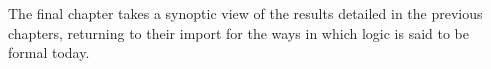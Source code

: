 			
			The final chapter takes a synoptic view of the results detailed in the previous chapters, returning to their import for the ways in which logic is said to be formal today.